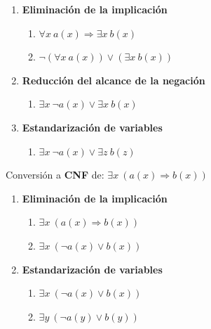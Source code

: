 \documentclass[12pt]{article} %
\begin{document}
\begin{enumerate}
\item \textbf{Eliminación de la implicación}

	\begin{enumerate}
		\item $\forall x\ a(x) \Rightarrow \exists x \ b(x)$
		\item $\neg(\forall x \ a(x)) \vee (\exists x \ b(x))$
	\end{enumerate}

\item \textbf{Reducción del alcance de la negación}

	\begin{enumerate}
		\item $\exists x \ \neg a(x) \vee \exists x \ b(x)$
	\end{enumerate}


\item \textbf{Estandarización de variables}

	\begin{enumerate}
		\item $\exists x \ \neg a(x) \vee \exists z \ b(z)$
	\end{enumerate}

\end{enumerate}

\par Conversión a \textbf{CNF} de: $\exists x \  (a(x) \Rightarrow b(x))$

\begin{enumerate}
\item \textbf{Eliminación de la implicación}

	\begin{enumerate}
		\item  $\exists x \  (a(x) \Rightarrow b(x))$
		\item  $\exists x \  (\neg a(x) \vee b(x))$
	\end{enumerate}


\item \textbf{Estandarización de variables}

	\begin{enumerate}
		\item  $\exists x \  (\neg a(x) \vee b(x))$
		\item  $\exists y \  (\neg a(y) \vee b(y))$
	\end{enumerate}

\end{enumerate}
\end{document}
